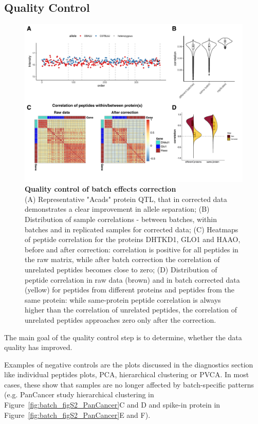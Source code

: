 \documentclass[num-refs]{wiley-article}
\begin{document}
\subsection{Quality Control}
\begin{figure}[hbt]
	\includegraphics[width=\textwidth]{figures/Fig5_quality_control2.pdf}
	
	\caption{\textbf{Quality control of batch effects correction}  \\
		\footnotesize
		(A) Representative "Acads" protein QTL, that in corrected data demonstrates a clear improvement in allele separation; (B) Distribution of sample correlations - between batches, within batches and in replicated samples for corrected data; (C)  Heatmaps of peptide correlation for the proteins DHTKD1, GLO1 and HAAO, before and after correction: correlation is positive for all peptides in the raw matrix, while after batch correction the correlation of unrelated peptides becomes close to zero; (D) Distribution of peptide correlation in raw data (brown) and in batch corrected data (yellow) for peptides from different proteins and peptides from the same protein: while same-protein peptide correlation is always higher than the correlation of unrelated peptides, the correlation of unrelated peptides approaches zero only after the correction.}
	\label{fig:batch_fig6_QualityControl}
\end{figure}


The main goal of the quality control step is to determine, whether the data quality has improved. 

Examples of negative controls are the plots discussed in the diagnostics section like individual peptides plots, PCA, hierarchical clustering or PVCA. In most cases, these show that samples are no longer affected by batch-specific patterns (e.g. PanCancer study hierarchical clustering in Figure~\ref{fig:batch_figS2_PanCancer}C and D and spike-in protein in Figure~\ref{fig:batch_figS2_PanCancer}E and F).
\end{document}
